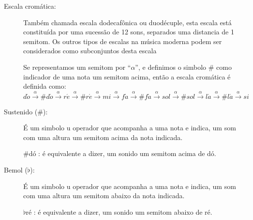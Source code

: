 \begin{description}
\item [Escala cromática:] \label{sec:pos:Cromatica}
Também chamada escala dodecafônica ou duodécuple, 
esta escala está constituída por uma sucessão de 12 sons, separados uma distancia de 1 semitom.
Os outros tipos de escalas na música moderna podem ser considerados como subconjuntos desta escala \cite[pp. 753]{apel1969harvard}
\begin{example} 
Se representamos um semitom por ``$\alpha$'', 
e definimos o simbolo $\#$ como indicador de uma nota um semitom acima, 
então a escala cromática é definida como:
\begin{equation*} 
d\acute{o}\overset{\alpha}{\rightarrow}
\#d\acute{o}\overset{\alpha}{\rightarrow}
r\acute{e}\overset{\alpha}{\rightarrow}
\#r\acute{e}\overset{\alpha}{\rightarrow}
mi\overset{\alpha}{\rightarrow}
f\acute{a}\overset{\alpha}{\rightarrow}
\#f\acute{a}\overset{\alpha}{\rightarrow}
sol\overset{\alpha}{\rightarrow}
\#sol\overset{\alpha}{\rightarrow}
l\acute{a}\overset{\alpha}{\rightarrow}
\#l\acute{a}\overset{\alpha}{\rightarrow}
si
\end{equation*}
\end{example}

\item [Sustenido ($\#$):] \label{sec:pos:Sustenido}
É um simbolo u operador que acompanha a uma nota e indica, um som com uma altura um semitom acima da nota indicada. 
\begin{example} $\#$dó : é equivalente a dizer, um sonido um semitom acima de dó.
\end{example}


\item [Bemol ($\flat$):] \label{sec:pos:Bemol}
É um simbolo u operador que acompanha a uma nota e indica, um som com uma altura um semitom abaixo da nota indicada. 
\begin{example} $\flat$ré : é equivalente a dizer, um sonido um semitom abaixo de ré.
\end{example}

\end{description}~\\

